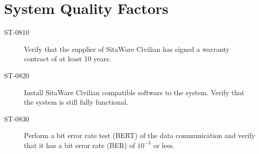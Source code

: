 \section{System Quality Factors}

\begin{description}
\item[ST-0810] Verify that the supplier of SitaWare Civilian has signed a warranty contract of at least 10 years.
\item[ST-0820] Install SitaWare Civilian compatible software to the system. Verify that the system is still fully functional. 
\item[ST-0830] Perform a bit error rate test (BERT) of the data communication and verify that it has a bit error rate (BER) of $10^{-3}$ or less. 
\end{description}
